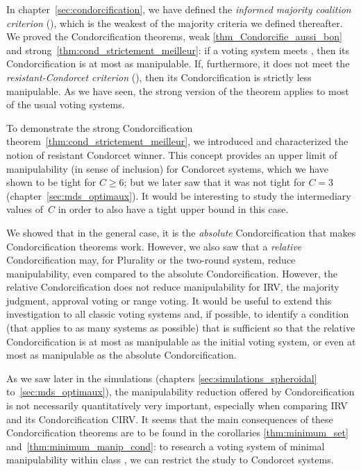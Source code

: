 \medskip
In chapter~\ref{sec:condorcification}, we have defined the \emph{informed majority coalition criterion} (\cminf{}), which is the weakest of the majority criteria we defined thereafter. We proved the Condorcification theorems, weak \ref{thm_Condorcifie_aussi_bon} and strong~\ref{thm:cond_strictement_meilleur}: if a voting system meets \cminf{}, then its Condorcification is at most as manipulable. If, furthermore, it does not meet the \emph{resistant-Condorcet criterion} (\rcond{}), then its Condorcification is strictly less manipulable. As we have seen, the strong version of the theorem applies to most of the usual voting systems.

To demonstrate the strong Condorcification theorem~\ref{thm:cond_strictement_meilleur}, we introduced and characterized the notion of resistant Condorcet winner. This concept provides an upper limit of manipulability (in sense of inclusion) for Condorcet systems, which we have shown to be tight for $ C \geq  6$; but we later saw that it was not tight for $ C = 3 $ (chapter~\ref{sec:mds_optimaux}). It would be interesting to study the intermediary values of~$ C $ in order to also have a tight upper bound in this case.

We showed that in the general case, it is the \emph{absolute} Condorcification that makes Condorcification theorems work. However, we also saw that a \emph{relative} Condorcification may, for Plurality or the two-round system, reduce manipulability, even compared to the absolute Condorcification. However, the relative Condorcification does not reduce manipulability for IRV, the majority judgment, approval voting or range voting. It would be useful to extend this investigation to all classic voting systems and, if possible, to identify a condition (that applies to as many systems as possible) that is sufficient so that the relative Condorcification is at most as manipulable as the initial voting system, or even at most as manipulable as the absolute Condorcification.

As we saw later in the simulations (chapters \ref{sec:simulations_spheroidal} to~\ref{sec:mds_optimaux}), the manipulability reduction offered by Condorcification is not necessarily quantitatively very important, especially when comparing IRV and its Condorcification CIRV. It seems that the main consequences of these Condorcification theorems are to be found in the corollaries \ref{thm:minimum_set} and~\ref{thm:minimum_manip_cond}: to research a voting system of minimal manipulability within class \cminf{}, we can restrict the study to Condorcet systems.

